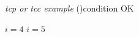 \documentclass{\SetClass}
\begin{document}
\IncMargin{1em}
\begin{algorithm}
  \BlankLine

  \emph{tcp or tcc  example}\;
  \If(){condition}{  %
  OK\;
  }

  $i=4$ %
  $i=5$ %




\end{algorithm}
\end{document}
